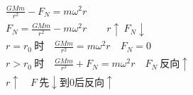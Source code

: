 \begin{gather*}
\frac{GMm}{r^2}-F_N=m\omega^2r\\
F_N=\frac{GMm}{r^2}-m\omega^2r\qquad r\uparrow\ F_N\downarrow\\
r=r_0\ \text{时}\quad \frac{GMm}{r^2}=m\omega^2r\quad F_N=0\\
r>r_0\ \text{时}\quad \frac{GMm}{r^2}+F_N=m\omega^2r\quad F_N\ \text{反向}\uparrow\\
r\uparrow\quad F\ \text{先}\downarrow\text{到0后反向}\uparrow
\end{gather*}
